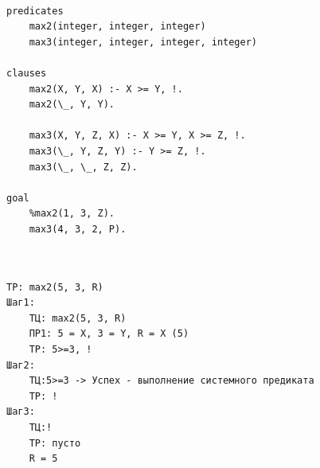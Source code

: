 \begin{lstlisting}[style=lispStyle, caption={ База знаний нахождения максимума среди двух элементов и трех.},
                    label={lst:max}]

predicates
    max2(integer, integer, integer)
    max3(integer, integer, integer, integer)

clauses
    max2(X, Y, X) :- X >= Y, !.
    max2(\_, Y, Y).

    max3(X, Y, Z, X) :- X >= Y, X >= Z, !.
    max3(\_, Y, Z, Y) :- Y >= Z, !.
    max3(\_, \_, Z, Z).

goal
    %max2(1, 3, Z).
    max3(4, 3, 2, P).


\end{lstlisting}

\begin{figure}[ht!]
\end{figure}


\begin{lstlisting}[style=lispStyle, caption={ Резольвента для правила max2, представленного в листинге \ref{lst:max}.},
                    label={lst:resolve}]

ТР: max2(5, 3, R)
Шаг1:
    ТЦ: max2(5, 3, R)
    ПР1: 5 = X, 3 = Y, R = X (5)
    ТР: 5>=3, !
Шаг2:
    ТЦ:5>=3 -> Успех - выполнение системного предиката
    ТР: !
Шаг3:
    ТЦ:!
    ТР: пусто
    R = 5

\end{lstlisting}


